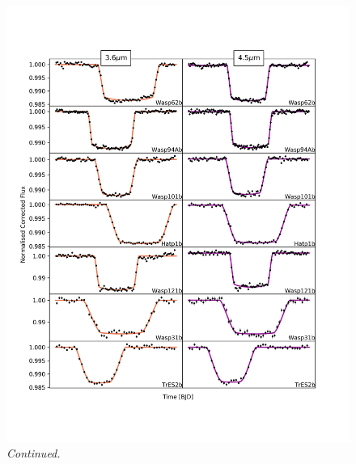 \begin{subappendices}
  \addtocounter{figure}{-1}
  \begin{figure}
    \includegraphics[trim={0 1cm 0 0},clip,width=\textwidth]{CorrectedLighctuves2.pdf}
    \caption{\textit{Continued.}}
    \label{P1:fig:normlc2}
  \end{figure}


\end{subappendices}
